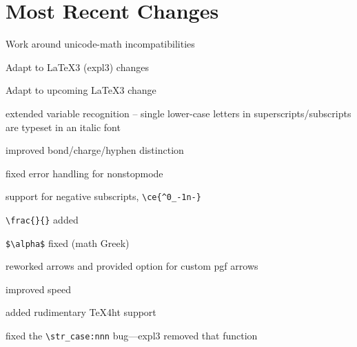 \documentclass[a4paper,notitlepage,parskip=half]{scrreprt}
\begin{document}
\section{Most Recent Changes}%

\begin{compactitem}
\item Work around unicode-math incompatibilities
\end{compactitem}

\begin{compactitem}
\item Adapt to \LaTeX3 (expl3) changes
\end{compactitem}

\begin{compactitem}
\item Adapt to upcoming \LaTeX3 change
\end{compactitem}

\begin{compactitem}
\item extended variable recognition -- single lower-case letters in superscripts/subscripts are typeset in an italic font
\item improved bond/charge/hyphen distinction 
\item fixed error handling for nonstopmode
\end{compactitem}

\begin{compactitem}
\item support for negative subscripts, \verb|\ce{^0_-1n-}|
\item \verb|\frac{}{}| added
\item \verb|$\alpha$| fixed (math Greek)
\end{compactitem}

\begin{compactitem}
\item reworked arrows and provided option for custom pgf arrows
\item improved speed
\end{compactitem}

\begin{compactitem}
\item added rudimentary TeX4ht support
\item fixed the \verb|\str_case:nnn| bug---expl3 removed that function
\end{compactitem}
\end{document}
